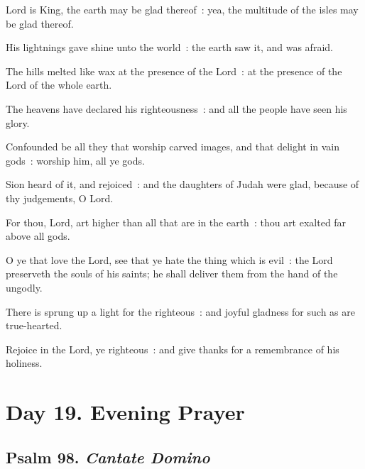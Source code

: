  Lord is King, the earth may be glad thereof~: yea, the multitude of the isles may be glad thereof.\par
{}
His lightnings gave shine unto the world~: the earth saw it, and was afraid.\par
{}The hills melted like wax at the presence of the Lord~: at the presence of the Lord of the whole earth.\par
{}The heavens have declared his righteousness~: and all the people have seen his glory.\par
{}Confounded be all they that worship carved images, and that delight in vain gods~: worship him, all ye gods.\par
{}Sion heard of it, and rejoiced~: and the daughters of Judah were glad, because of thy judgements, O Lord.\par
{}For thou, Lord, art higher than all that are in the earth~: thou art exalted far above all gods.\par
{}O ye that love the Lord, see that ye hate the thing which is evil~: the Lord preserveth the souls of his saints; he shall deliver them from the hand of the ungodly.\par
{}There is sprung up a light for the righteous~: and joyful gladness for such as are true-hearted.\par
{}Rejoice in the Lord, ye righteous~: and give thanks for a remembrance of his holiness.\par

\section*{Day 19. Evening Prayer}

\subsection{Psalm 98. \textit{Cantate Domino}}

